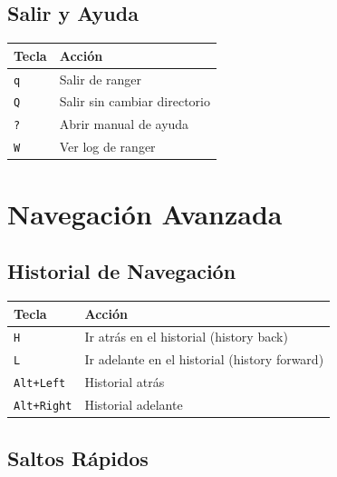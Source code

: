 \documentclass[
  doc,
  floatsintext,
  longtable,
  a4paper,
  nolmodern,
  notxfonts,
  notimes,
  12pt,
  colorlinks=true,linkcolor=blue,citecolor=blue,urlcolor=blue]{apa7}
\newcounter{none} %
\begin{document}
\subsection{Salir y Ayuda}\label{salir-y-ayuda}

{\def\LTcaptype{none} %
\begin{longtable}[]{@{}ll@{}}
\toprule\noalign{}
Tecla & Acción \\
\midrule\noalign{}
\endhead
\bottomrule\noalign{}
\endlastfoot
\texttt{q} & Salir de ranger \\
\texttt{Q} & Salir sin cambiar directorio \\
\texttt{?} & Abrir manual de ayuda \\
\texttt{W} & Ver log de ranger \\
\end{longtable}
}

\section{Navegación Avanzada}\label{navegaciuxf3n-avanzada}

\subsection{Historial de Navegación}\label{historial-de-navegaciuxf3n}

{\def\LTcaptype{none} %
\begin{longtable}[]{@{}ll@{}}
\toprule\noalign{}
Tecla & Acción \\
\midrule\noalign{}
\endhead
\bottomrule\noalign{}
\endlastfoot
\texttt{H} & Ir atrás en el historial (history back) \\
\texttt{L} & Ir adelante en el historial (history forward) \\
\texttt{Alt+Left} & Historial atrás \\
\texttt{Alt+Right} & Historial adelante \\
\end{longtable}
}

\subsection{Saltos Rápidos}\label{saltos-ruxe1pidos}
\end{document}

